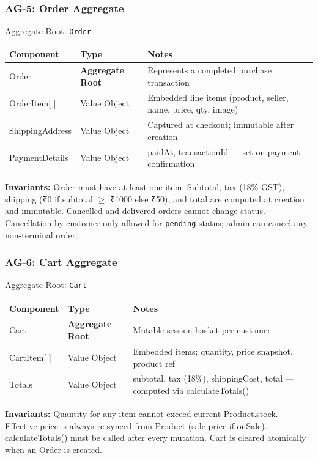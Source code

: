 \documentclass[12pt,a4paper]{article}
\begin{document}
\subsubsection{AG-5: Order Aggregate}

\begin{infobox}{Aggregate Root: \texttt{Order}}
\begin{tabular}{@{}p{3cm}p{2.8cm}p{7.8cm}@{}}
\textbf{Component} & \textbf{Type} & \textbf{Notes} \\
\hline
Order & \textbf{Aggregate Root} & Represents a completed purchase transaction \\
OrderItem[ ] & Value Object & Embedded line items (product, seller, name, price, qty, image) \\
ShippingAddress & Value Object & Captured at checkout; immutable after creation \\
PaymentDetails & Value Object & paidAt, transactionId — set on payment confirmation \\
\end{tabular}

\textbf{Invariants:} Order must have at least one item. Subtotal, tax (18\% GST), shipping (₹0 if subtotal $\geq$ ₹1000 else ₹50), and total are computed at creation and immutable. Cancelled and delivered orders cannot change status. Cancellation by customer only allowed for \texttt{pending} status; admin can cancel any non-terminal order.
\end{infobox}

\subsubsection{AG-6: Cart Aggregate}

\begin{infobox}{Aggregate Root: \texttt{Cart}}
\begin{tabular}{@{}p{3cm}p{2.8cm}p{7.8cm}@{}}
\textbf{Component} & \textbf{Type} & \textbf{Notes} \\
\hline
Cart & \textbf{Aggregate Root} & Mutable session basket per customer \\
CartItem[ ] & Value Object & Embedded items; quantity, price snapshot, product ref \\
Totals & Value Object & subtotal, tax (18\%), shippingCost, total — computed via calculateTotals() \\
\end{tabular}

\textbf{Invariants:} Quantity for any item cannot exceed current Product.stock. Effective price is always re-synced from Product (sale price if onSale). calculateTotals() must be called after every mutation. Cart is cleared atomically when an Order is created.
\end{infobox}
\end{document}
